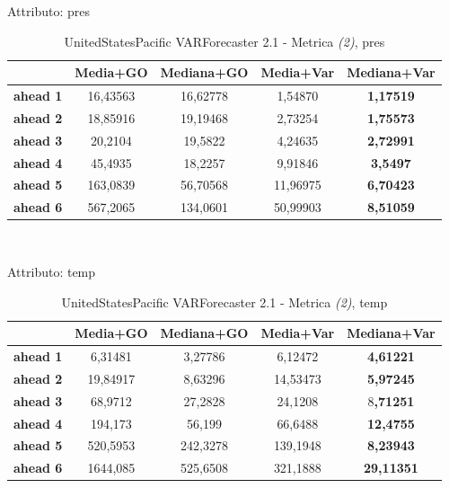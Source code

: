 \documentclass[12pt,a4paper,oneside,openright]{book}
\begin{document}
\medskip

Attributo: pres \\ 

\begin{table}[H]
\centering
\begin{tabular}{|c|c|c|c|c|}
\hline
 & \textbf{Media+GO} & \textbf{Mediana+GO} & \textbf{Media+Var} & \textbf{Mediana+Var} \\
\hline
\textbf{ahead 1} & 16,43563 & 16,62778 & 1,54870 & \textbf{1,17519} \\
\hline
\textbf{ahead 2} & 18,85916 & 19,19468 & 2,73254 & \textbf{1,75573} \\
\hline
\textbf{ahead 3} & 20,2104 & 19,5822 & 4,24635 & \textbf{2,72991} \\
\hline
\textbf{ahead 4} & 45,4935 & 18,2257 & 9,91846 & \textbf{3,5497} \\
\hline
\textbf{ahead 5} & 163,0839 & 56,70568 & 11,96975 & \textbf{6,70423} \\
\hline
\textbf{ahead 6} & 567,2065 & 134,0601 & 50,99903 & \textbf{8,51059} \\
\hline
\end{tabular} \\
\caption{UnitedStatesPacific VARForecaster 2.1 - Metrica \textit{(2)}, pres}
\end{table}

\medskip

Attributo: temp \\ 

\begin{table}[H]
\centering
\begin{tabular}{|c|c|c|c|c|}
\hline
 & \textbf{Media+GO} & \textbf{Mediana+GO} & \textbf{Media+Var} & \textbf{Mediana+Var} \\
\hline
\textbf{ahead 1} & 6,31481 & 3,27786 & 6,12472 & \textbf{4,61221} \\
\hline
\textbf{ahead 2} & 19,84917 & 8,63296 & 14,53473 & \textbf{5,97245} \\
\hline
\textbf{ahead 3} & 68,9712 & 27,2828 & 24,1208 & 8\textbf{,71251} \\
\hline
\textbf{ahead 4} & 194,173 & 56,199 & 66,6488 & \textbf{12,4755} \\
\hline
\textbf{ahead 5} & 520,5953 & 242,3278 & 139,1948 & \textbf{8,23943} \\
\hline
\textbf{ahead 6} & 1644,085 & 525,6508 & 321,1888 & \textbf{29,11351} \\
\hline
\end{tabular} \\
\caption{UnitedStatesPacific VARForecaster 2.1 - Metrica \textit{(2)}, temp}
\end{table}
\end{document}
